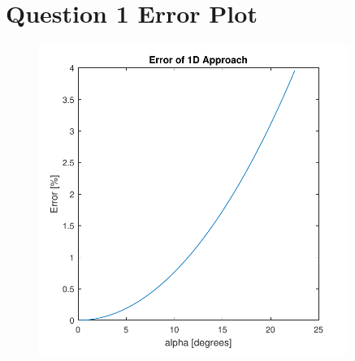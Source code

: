 \documentclass[letterpaper,12pt,]{article}
\begin{document}
\newpage
{}

\section*{Question 1 Error Plot}

\begin{figure}[h!]
  \centering
  \includegraphics[width=0.9\textwidth]{plotq1}
\end{figure}

\newpage
\end{document}
